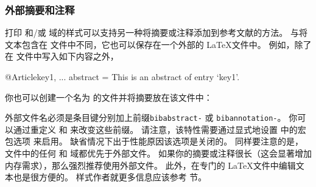 \subsubsection{外部摘要和注释}%
\label{use:use:prf}


打印  和/或   域的样式可以支持另一种将摘要或注释添加到参考文献的方法。
与将文本包含在  文件中不同，它也可以保存在一个外部的 \LaTeX 文件中。
例如，除了在  文件中写入如下内容之外，

\begin{ltxexample}[style=bibtex]
@Article{key1,
  ...
  abstract	  = {This is an abstract of entry `key1'.}
}
\end{ltxexample}
%
你也可以创建一个名为  的文件并将摘要放在该文件中：

%
外部文件名必须是条目键分别加上前缀\texttt{bibabstract-} 或 \texttt{bibannotation-}。
你可以通过重定义  和  来改变这些前缀。
请注意，该特性需要通过显式地设置  中的宏包选项  来启用。
缺省情况下出于性能原因该选项是关闭的。
同样要注意的是， 文件中的任何  和  域都优先于外部文件。
如果你的摘要或注释很长（这会显著增加内存需求），那么强烈推荐使用外部文件。
此外，在专门的 \LaTeX 文件中编辑文本也是很方便的。
样式作者就更多信息应该参考  节。

